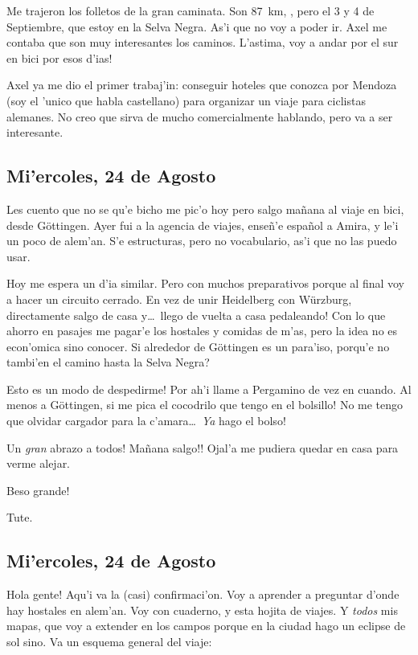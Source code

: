 Me trajeron los folletos de la gran caminata. Son 87~km, ,
pero el 3 y 4 de Septiembre, que estoy en la Selva Negra. As'i que no voy a
poder ir. Axel me contaba que son muy interesantes los caminos.
L'astima, \textexclamdown voy a andar por el sur en bici por esos d'ias!

Axel ya me dio el primer trabaj'in: conseguir hoteles que conozca por Mendoza
(soy el 'unico que habla castellano) para organizar un viaje para ciclistas
alemanes. No creo que sirva de mucho comercialmente hablando, pero va a ser
interesante.

\subsection*{Mi'ercoles, 24 de Agosto}

Les cuento que no se qu'e bicho me pic'o hoy pero salgo ma\~nana al viaje en
bici, desde G\"ottingen. Ayer fui a la agencia de viajes, ense\~n'e espa\~nol a
Amira, y le'i un poco de alem'an. S'e estructuras, pero no vocabulario, as'i que
no las puedo usar.

Hoy me espera un d'ia similar. Pero con muchos preparativos porque al final voy
a hacer un circuito cerrado. En vez de unir Heidelberg con W\"urzburg,
directamente salgo de casa y\ldots\ \textexclamdown llego de vuelta a casa
pedaleando! Con lo que ahorro en pasajes me pagar'e los hostales y comidas de
m'as, pero la idea no es econ'omica sino conocer. Si alrededor de G\"ottingen es
un para'iso, \textquestiondown porqu'e no tambi'en el camino hasta la Selva
Negra?

\textexclamdown Esto es un modo de despedirme! Por ah'i llame a Pergamino de vez
en cuando. \textexclamdown Al menos a G\"ottingen, si me pica el cocodrilo que
tengo en el bolsillo! No me tengo que olvidar cargador para la c'amara\ldots\
\textexclamdown\emph{Ya} hago el bolso!

\textexclamdown Un \emph{gran} abrazo a todos! \textexclamdown \textexclamdown
Ma\~nana salgo!! Ojal'a me pudiera quedar en casa para verme alejar.

\textexclamdown Beso grande!

Tute.

\subsection*{Mi'ercoles, 24 de Agosto}

\textexclamdown Hola gente! Aqu'i va la (casi) confirmaci'on. Voy a aprender a
preguntar d'onde hay hostales en alem'an. Voy con cuaderno, y esta hojita de
viajes. Y \emph{todos} mis mapas, que voy a extender en los campos porque en la
ciudad hago un eclipse de sol sino. Va un esquema general del viaje:

